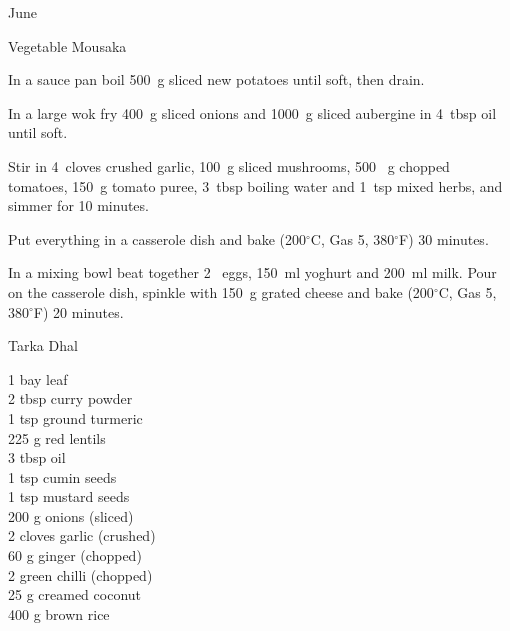 \begin{menu}{June}
\begin{recipe}{2}{Vegetable Mousaka}
    \begin{instructions}
    \item 
        In a sauce pan boil
        500~g sliced new potatoes
        until soft,
        then drain.
      \item 
        In a large wok fry
        400~g sliced onions
        and
        1000~g sliced aubergine
        in
        4~tbsp  oil
        until soft.
      \item 
        Stir in
        4~cloves crushed garlic,
        100~g sliced mushrooms,
        500 ~g chopped tomatoes,
        150~g  tomato puree,
        3~tbsp  boiling water
        and
        1~tsp  mixed herbs,
        and simmer for 10 minutes.
      \item 
        Put everything in a casserole dish
        and bake (200$^{\circ}$C, Gas 5, 380$^{\circ}$F) 30 minutes.
      \item 
        In a mixing bowl beat together
        2~  eggs,
        150~ml  yoghurt
        and
        200~ml  milk.
        Pour on the casserole dish, spinkle with
        150~g grated cheese
        and bake (200$^{\circ}$C, Gas 5, 380$^{\circ}$F) 20 minutes.
      
    \end{instructions}
    \end{recipe}%
  
    \begin{recipe}{2}{Tarka Dhal}%
		\begin{ingredients}
		1  bay leaf  \\
	2 tbsp curry powder  \\
	1 tsp ground turmeric  \\
	225 g red lentils  \\
	3 tbsp oil  \\
	1 tsp cumin seeds  \\
	1 tsp mustard seeds  \\
	200 g onions (sliced) \\
	2 cloves garlic (crushed) \\
	60 g ginger (chopped) \\
	2  green chilli (chopped) \\
	25 g creamed coconut  \\
	400 g brown rice  \\
	
		\end{ingredients}
	

\end{recipe}
\end{menu}
